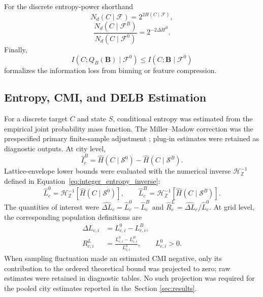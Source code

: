 \documentclass[applsci,article,accept,moreauthors]{Definitions/mdpi}
\def\hl#1{#1}%
\begin{document}
For the discrete entropy-power shorthand
\begin{equation}
N_d(C\mid\mathcal F)=2^{2H(C\mid\mathcal F)},
\label{eq:discrete_entropy_power}
\end{equation}
\begin{equation}
\frac{N_d(C\mid\mathcal F^B)}
{N_d(C\mid\mathcal F^0)}
=2^{-2\Delta H^B}.
\label{eq:cmi_entropy_power_ratio}
\end{equation}
Finally,
\begin{equation}
I(C;Q_B(\mathbf B)\mid\mathcal F^0)
\leq I(C;\mathbf B\mid\mathcal F^0)
\label{eq:bicycle_data_processing}
\end{equation}
formalizes the information loss from binning or feature compression.


\subsection{Entropy, CMI, and DELB Estimation}
\label{subsec:entropy_estimation}

For a discrete target \(C\) and state \(S\), conditional entropy was
estimated from the empirical joint probability mass function. The
Miller--Madow correction was the prespecified primary finite-sample
adjustment \citep{miller1955}; plug-in estimates were retained as diagnostic
outputs. At city level,
\begin{equation}
\widehat I^{B}_{c}
=\widehat H(C\mid\mathcal{S}^{0})
-\widehat H(C\mid\mathcal{S}^{B}).
\label{eq:empirical_cmi}
\end{equation}
Lattice-envelope lower bounds were evaluated with the numerical inverse
\(\mathcal H_{\mathbb Z}^{-1}\) defined in
Equation~\eqref{eq:integer_entropy_inverse}:
\begin{equation}
\widehat L^0_c
=\mathcal H_{\mathbb Z}^{-1}
\!\left[\widehat H(C\mid\mathcal S^0)\right],
\qquad
\widehat L^B_c
=\mathcal H_{\mathbb Z}^{-1}
\!\left[\widehat H(C\mid\mathcal S^B)\right].
\label{eq:empirical_exact_bounds}
\end{equation}
The quantities of interest were
\(\widehat{\Delta L}_c=\widehat L^0_c-\widehat L^B_c\) and
\(\widehat R^L_c=\widehat{\Delta L}_c/\widehat L^0_c\).
At grid level, the corresponding population definitions are
\begin{align}
\Delta L_{c,i}
&=L^0_{c,i}-L^B_{c,i},
\label{eq:absolute_bound_reduction}\\
R^L_{c,i}
&=\frac{L^0_{c,i}-L^B_{c,i}}{L^0_{c,i}},
\qquad L^0_{c,i}>0.
\label{eq:relative_bound_reduction}
\end{align}
When sampling fluctuation made an estimated CMI negative, only its
contribution to the ordered theoretical bound was projected to zero; raw
estimates were retained in diagnostic tables. No such projection was
required for the pooled city estimates reported in the\linebreak  ~\hl{Section} %
\ref{sec:results}.
\end{document}
